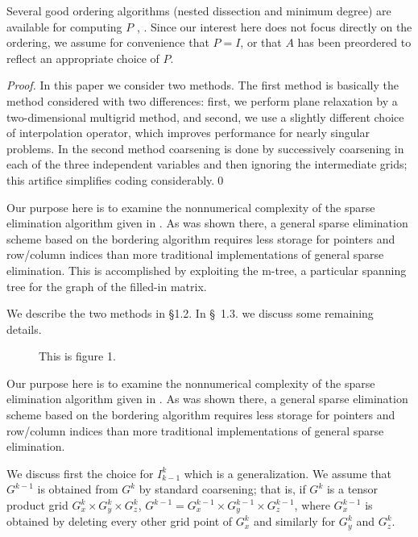 Several good ordering algorithms (nested dissection and minimum degree)
are available for computing $P$  \cite{GEORGELIU}, \cite{ROSE72}.
Since our interest here does not
focus directly on the ordering, we assume for convenience that $P=I$,
or that $A$ has been preordered to reflect an appropriate choice of $P$.


\begin{proof} In this paper we consider two methods. The first method
is
basically the method considered with two differences:
first, we perform plane relaxation by a two-dimensional
multigrid method, and second, we use a slightly different
choice of
interpolation operator, which improves performance
for nearly singular problems. In the second method coarsening
is done by successively coarsening in each of the three
independent variables and then ignoring the intermediate
grids; this artifice simplifies coding considerably.\qed
\end{proof}

Our purpose here is to examine the nonnumerical complexity of the
sparse elimination algorithm given in  \cite{BANKSMITH}.
As was shown there, a general sparse elimination scheme based on the
bordering algorithm requires less storage for pointers and
row/column indices than more traditional implementations of general
sparse elimination.  This is accomplished by exploiting the m-tree,
a particular spanning tree for the graph of the filled-in matrix.

\begin{Definition}{\rm We describe the two methods in \S 1.2. In \S\ 1.3. we
discuss
some remaining details.}
\end{Definition}

\begin{figure}
\vspace*{24pc}
\caption{This is  figure 1.}
\end{figure}

Our purpose here is to examine the nonnumerical complexity of the
sparse elimination algorithm given in  \cite{BANKSMITH}.
As was shown there, a general sparse elimination scheme based on the
bordering algorithm requires less storage for pointers and
row/column indices than more traditional implementations of general
sparse elimination.  

\begin{lemma} We discuss first the choice for $I_{k-1}^k$
which is a generalization. We assume that $G^{k-1}$ is
obtained
from $G^k$
by standard coarsening; that is, if $G^k$ is a tensor product
grid $G_{x}^k \times G_{y}^k \times G_{z}^k$,
$G^{k-1}=G_{x}^{k-1} \times G_{y}^{k-1} \times G_{z}^{k-1}$,
where $G_{x}^{k-1}$ is obtained by deleting every other grid
point of $G_x^k$ and similarly for $G_{y}^k$ and $G_{z}^k$.
\end{lemma}
 
